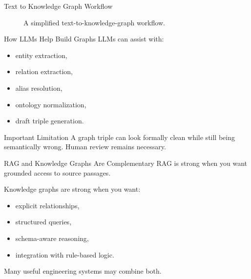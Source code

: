 \documentclass[12pt]{beamer}
\begin{document}
\begin{frame}{Text to Knowledge Graph Workflow}
  \begin{figure}
    \centering
    \caption{A simplified text-to-knowledge-graph workflow.}
  \end{figure}
\end{frame}

\begin{frame}{How LLMs Help Build Graphs}
  LLMs can assist with:
  \begin{itemize}
    \item entity extraction,
    \item relation extraction,
    \item alias resolution,
    \item ontology normalization,
    \item draft triple generation.
  \end{itemize}

  \begin{warningbox}{Important Limitation}
    A graph triple can look formally clean while still being semantically wrong. Human review remains necessary.
  \end{warningbox}
\end{frame}

\begin{frame}{RAG and Knowledge Graphs Are Complementary}
  RAG is strong when you want grounded access to source passages.

  Knowledge graphs are strong when you want:
  \begin{itemize}
    \item explicit relationships,
    \item structured queries,
    \item schema-aware reasoning,
    \item integration with rule-based logic.
  \end{itemize}

  Many useful engineering systems may combine both.
\end{frame}
\end{document}
